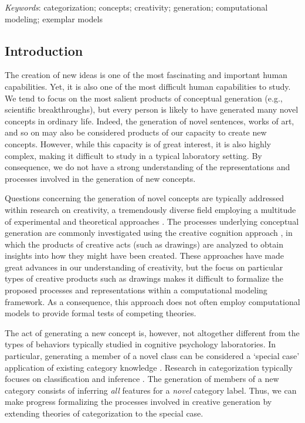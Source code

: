 \documentclass[12pt]{article}
\begin{document}
\setlength\parindent{0.5in}
{\em Keywords}: categorization; concepts; creativity; generation; computational modeling; exemplar models
\clearpage


\begin{flushleft}

\section{Introduction}
\setlength\parindent{0.5in}


The creation of new ideas is one of the most fascinating and important human capabilities. Yet, it is also one of the most difficult human capabilities to study.  We tend to focus on the most salient products of conceptual generation (e.g., scientific breakthroughs), but every person is likely to have generated many novel concepts in ordinary life. Indeed, the generation of novel sentences, works of art, and so on may also be considered products of our capacity to create new concepts. However, while this capacity is of great interest, it is also highly complex, making it difficult to study in a typical laboratory setting. By consequence, we do not have a strong understanding of the representations and processes involved in the generation of new concepts.

Questions concerning the generation of novel concepts are typically addressed within research on creativity, a tremendously diverse field employing a multitude of experimental and theoretical approaches \citep[see][]{kaufman2010handbook}. The processes underlying conceptual generation are commonly investigated using the creative cognition approach \citep{finke1992creative, smith1995creative}, in which the products of creative acts (such as drawings) are analyzed to obtain insights into how they might have been created. These approaches have made great advances in our understanding of creativity, but the focus on particular types of creative products such as drawings makes it difficult to formalize the proposed processes and representations within a computational modeling framework. As a consequence, this approach does not often employ computational models to provide formal tests of competing theories. 

The act of generating a new concept is, however, not altogether different from the types of behaviors typically studied in cognitive psychology laboratories. In particular, generating a member of a novel class can be considered a `special case' application of existing category knowledge \citep{kemp2014taxonomy,kurtz2015human}. Research in categorization typically focuses on classification \citep[predicting an object's category given its features;][]{shepard1961learning,kurtz2013human} and inference \citep[predicting an object's unobserved features given observed features and a category label, see e.g.,][]{markman2003category}. The generation of members of a new category consists of inferring {\em all} features for a {\em novel} category label. Thus, we can make progress formalizing the processes involved in creative generation by extending theories of categorization to the special case.


\end{flushleft}
\end{document}
